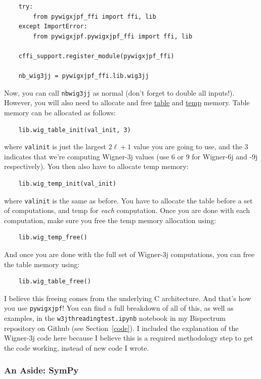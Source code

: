 \documentclass[11pt]{article}
\renewcommand{\_}[1]{\underline{ #1 }}
\begin{document}
{\begin{verbatim}
    try:
        from pywigxjpf_ffi import ffi, lib
    except ImportError:
        from pywigxjpf.pywigxjpf_ffi import ffi, lib

    cffi_support.register_module(pywigxjpf_ffi)

    nb_wig3jj = pywigxjpf_ffi.lib.wig3jj
\end{verbatim}

Now, you can call \texttt{nb\textunderscore wig3jj} as normal (don't forget to double all inputs!). However, you will also need to allocate and free \underline{table} and \underline{temp} memory. Table memory can be allocated as follows:
\begin{verbatim}
    lib.wig_table_init(val_init, 3)
\end{verbatim}

where \texttt{val\textunderscore init} is just the largest $2\ell + 1$ value you are going to use, and the $3$ indicates that we're computing Wigner-3j values (use $6$ or $9$ for Wigner-6j and -9j respectively). You then also have to allocate temp memory:
\begin{verbatim}
    lib.wig_temp_init(val_init)
\end{verbatim}

where \texttt{val\textunderscore init} is the same as before. You have to allocate the table before a set of computations, and temp for \textit{each} computation. Once you are done with each computation, make sure you free the temp memory allocation using:
\begin{verbatim}
    lib.wig_temp_free()
\end{verbatim}

And once you are done with the full set of Wigner-3j computations, you can free the table memory using:
\begin{verbatim}
    lib.wig_table_free()
\end{verbatim}

I believe this freeing comes from the underlying C architecture. And that's how you use \texttt{pywigxjpf}! You can find a full breakdown of all of this, as well as examples, in the \texttt{w3j\textunderscore threading\textunderscore test.ipynb} notebook in my Bispectrum repository on Github (see Section~\ref{code}). I included the explanation of the Wigner-3j code here because I believe this is a required methodology step to get the code working, instead of new code I wrote.

\subsubsection{An Aside: SymPy}

}
\end{document}
